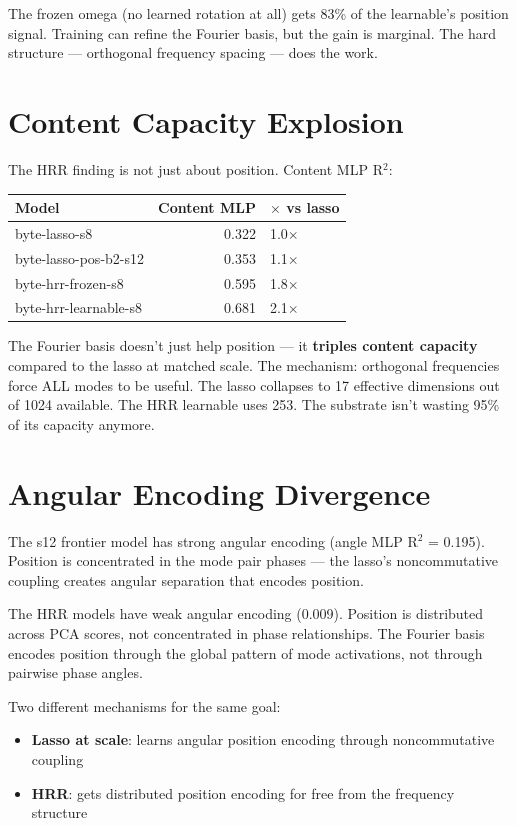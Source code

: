 \documentclass[11pt,a4paper]{report}
\begin{document}
The frozen omega (no learned rotation at all) gets 83\% of the learnable's position signal. Training can refine the Fourier basis, but the gain is marginal. The hard structure --- orthogonal frequency spacing --- does the work.

\section{Content Capacity Explosion}

The HRR finding is not just about position. Content MLP R$^2$:

\begin{center}
\begin{tabular}{lrl}
\toprule
Model & Content MLP & $\times$ vs lasso \\
\midrule
byte-lasso-s8 & 0.322 & 1.0$\times$ \\
byte-lasso-pos-b2-s12 & 0.353 & 1.1$\times$ \\
byte-hrr-frozen-s8 & 0.595 & 1.8$\times$ \\
byte-hrr-learnable-s8 & 0.681 & 2.1$\times$ \\
\bottomrule
\end{tabular}
\end{center}

The Fourier basis doesn't just help position --- it \textbf{triples content capacity} compared to the lasso at matched scale. The mechanism: orthogonal frequencies force ALL modes to be useful. The lasso collapses to 17 effective dimensions out of 1024 available. The HRR learnable uses 253. The substrate isn't wasting 95\% of its capacity anymore.

\section{Angular Encoding Divergence}

The s12 frontier model has strong angular encoding (angle MLP R$^2$ = 0.195). Position is concentrated in the mode pair phases --- the lasso's noncommutative coupling creates angular separation that encodes position.

The HRR models have weak angular encoding (0.009). Position is distributed across PCA scores, not concentrated in phase relationships. The Fourier basis encodes position through the global pattern of mode activations, not through pairwise phase angles.

Two different mechanisms for the same goal:
\begin{itemize}[nosep]
\item \textbf{Lasso at scale}: learns angular position encoding through noncommutative coupling
\item \textbf{HRR}: gets distributed position encoding for free from the frequency structure
\end{itemize}
\end{document}
